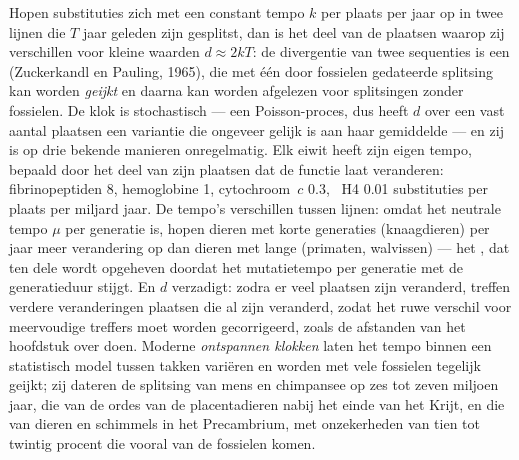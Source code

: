 \begin{proposition}\label{prop:b3:molecular-evolution:clock}
Hopen substituties zich met een constant tempo $k$ per plaats per jaar
op in twee lijnen die $T$ jaar geleden zijn gesplitst, dan is het deel
van de plaatsen waarop zij verschillen voor kleine waarden
$d \approx 2kT$: de divergentie van twee sequenties is een
\emph{} (Zuckerkandl en Pauling, 1965), die met één
door fossielen gedateerde splitsing kan worden \emph{geijkt} en daarna
kan worden afgelezen voor splitsingen zonder fossielen. De klok is
stochastisch --- een Poisson-proces, dus heeft $d$ over een vast aantal
plaatsen een variantie die ongeveer gelijk is aan haar gemiddelde ---
en zij is op drie bekende manieren onregelmatig. Elk eiwit heeft zijn
eigen tempo, bepaald door het deel van zijn plaatsen dat de functie
laat veranderen: fibrinopeptiden \num{8}, hemoglobine \num{1},
cytochroom~$c$ \num{0.3}, ~H4 \num{0.01} substituties per plaats
per miljard jaar. De tempo's verschillen tussen lijnen: omdat het
neutrale tempo $\mu$ per generatie is, hopen dieren met korte
generaties (knaagdieren) per jaar meer verandering op dan dieren met
lange (primaten, walvissen) --- het \emph{},
dat ten dele wordt opgeheven doordat het mutatietempo per generatie met
de generatieduur stijgt. En $d$ verzadigt: zodra er veel plaatsen zijn
veranderd, treffen verdere veranderingen plaatsen die al zijn
veranderd, zodat het ruwe verschil voor meervoudige treffers moet
worden gecorrigeerd, zoals de afstanden van het hoofdstuk over
 doen. Moderne \emph{ontspannen klokken} laten het tempo
binnen een statistisch model tussen takken variëren en worden met vele
fossielen tegelijk geijkt; zij dateren de splitsing van mens en
chimpansee op zes tot zeven miljoen jaar, die van de ordes van de
placentadieren nabij het einde van het Krijt, en die van dieren en
schimmels in het Precambrium, met onzekerheden van tien tot twintig
procent die vooral van de fossielen komen.
\end{proposition}
